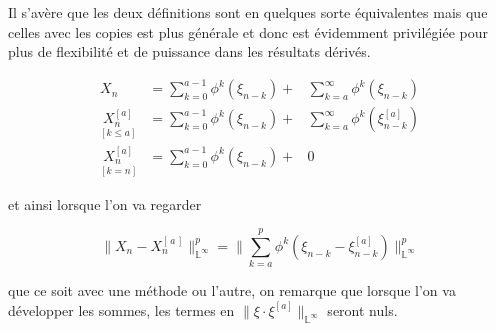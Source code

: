 Il s'avère que les deux définitions sont en quelques sorte \og équivalentes \fg mais que celles avec les copies est plus générale et donc est évidemment privilégiée pour plus de flexibilité et de puissance dans les résultats dérivés.

\begin{equation*}
	\begin{array}{ccc}
	X_n                               & = \sum\limits_{k=0}^{a-1} \phi^k( \xi_{n-k}) + & \sum\limits_{k=a}^{\infty} \phi^k( \xi_{n-k})
	\\
	\underset {[k\leq a]} {X_n^{[a]}} & = \sum\limits_{k=0}^{a-1} \phi^k( \xi_{n-k}) + & \sum\limits_{k=a}^{\infty} \phi^k( \xi_{n-k}^{[a]})
	\\
	\underset {[k = n]} {X_n^{[a]}}   & = \sum\limits_{k=0}^{a-1} \phi^k( \xi_{n-k}) + & 0
	\end{array}
\end{equation*}

et ainsi lorsque l'on va regarder

\begin{equation*}
	{\lVert {X_n} - {X_n^{[\, a \, ]}} } \rVert_{{\mathds L} ^\infty}^p= \lVert \sum\limits_{k=a}^p \phi^k( \xi_{n-k} - \xi_{n-k}^{[a]}) \rVert_{{\mathds L} ^\infty}^p
\end{equation*}

\noindent que ce soit avec une méthode ou l'autre, on remarque que lorsque l'on va développer les sommes, les termes en $\lVert{\xi \cdot \xi^{[a]}}\rVert_{\mathds L^\infty}$ seront nuls.


